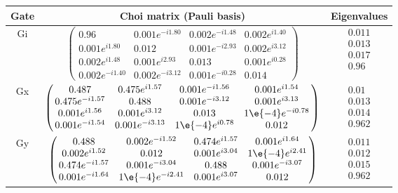 {\begin{table}[h]
\begin{center}
\begin{tabular}[l]{|c|c|c|}
\hline
Gate & Choi matrix (Pauli basis) & Eigenvalues \\ \hline
Gi & $ \left(\!\!\begin{array}{cccc}
0.96 & 0.001e^{-i1.80} & 0.002e^{-i1.48} & 0.002e^{i1.40} \\ 
0.001e^{i1.80} & 0.012 & 0.001e^{-i2.93} & 0.002e^{i3.12} \\ 
0.002e^{i1.48} & 0.001e^{i2.93} & 0.013 & 0.001e^{i0.28} \\ 
0.002e^{-i1.40} & 0.002e^{-i3.12} & 0.001e^{-i0.28} & 0.014
 \end{array}\!\!\right) $
 & $ \begin{array}{c}
0.011 \\ 
0.013 \\ 
0.017 \\ 
0.96
 \end{array} $
 \\ \hline
Gx & $ \left(\!\!\begin{array}{cccc}
0.487 & 0.475e^{i1.57} & 0.001e^{-i1.56} & 0.001e^{i1.54} \\ 
0.475e^{-i1.57} & 0.488 & 0.001e^{-i3.12} & 0.001e^{i3.13} \\ 
0.001e^{i1.56} & 0.001e^{i3.12} & 0.013 & 1\e{-4}e^{-i0.78} \\ 
0.001e^{-i1.54} & 0.001e^{-i3.13} & 1\e{-4}e^{i0.78} & 0.012
 \end{array}\!\!\right) $
 & $ \begin{array}{c}
0.01 \\ 
0.013 \\ 
0.014 \\ 
0.962
 \end{array} $
 \\ \hline
Gy & $ \left(\!\!\begin{array}{cccc}
0.488 & 0.002e^{-i1.52} & 0.474e^{i1.57} & 0.001e^{i1.64} \\ 
0.002e^{i1.52} & 0.012 & 0.001e^{i3.04} & 1\e{-4}e^{i2.41} \\ 
0.474e^{-i1.57} & 0.001e^{-i3.04} & 0.488 & 0.001e^{-i3.07} \\ 
0.001e^{-i1.64} & 1\e{-4}e^{-i2.41} & 0.001e^{i3.07} & 0.012
 \end{array}\!\!\right) $
 & $ \begin{array}{c}
0.011 \\ 
0.012 \\ 
0.015 \\ 
0.962
 \end{array} $
 \\ \hline
\end{tabular}


\end{center}
\end{table}}
